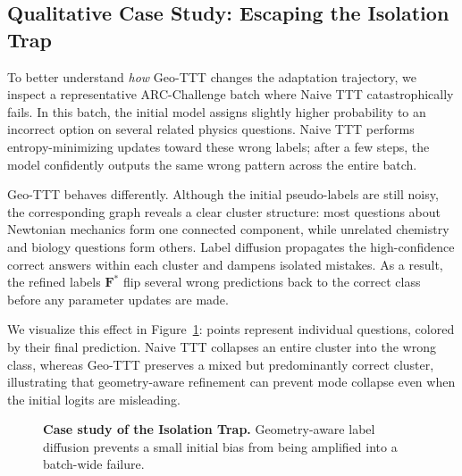 \documentclass{article}
\theoremstyle{plain}
\theoremstyle{definition}
\theoremstyle{remark}
\newcommand{\F}{\mathbf{F}}        %
\begin{document}
\subsection{Qualitative Case Study: Escaping the Isolation Trap}
\label{sec:case}

To better understand \emph{how} Geo-TTT changes the adaptation trajectory, we inspect a representative ARC-Challenge batch where Naive TTT catastrophically fails. In this batch, the initial model assigns slightly higher probability to an incorrect option on several related physics questions. Naive TTT performs entropy-minimizing updates toward these wrong labels; after a few steps, the model confidently outputs the same wrong pattern across the entire batch.

Geo-TTT behaves differently. Although the initial pseudo-labels are still noisy, the corresponding graph reveals a clear cluster structure: most questions about Newtonian mechanics form one connected component, while unrelated chemistry and biology questions form others. Label diffusion propagates the high-confidence correct answers within each cluster and dampens isolated mistakes. As a result, the refined labels $\F^*$ flip several wrong predictions back to the correct class before any parameter updates are made.

We visualize this effect in Figure~\ref{fig:case_study}: points represent individual questions, colored by their final prediction. Naive TTT collapses an entire cluster into the wrong class, whereas Geo-TTT preserves a mixed but predominantly correct cluster, illustrating that geometry-aware refinement can prevent mode collapse even when the initial logits are misleading.

\begin{figure}[t]
    \centering
    \caption{\textbf{Case study of the Isolation Trap.} Geometry-aware label diffusion prevents a small initial bias from being amplified into a batch-wide failure.}
    \label{fig:case_study}
\end{figure}
\end{document}
